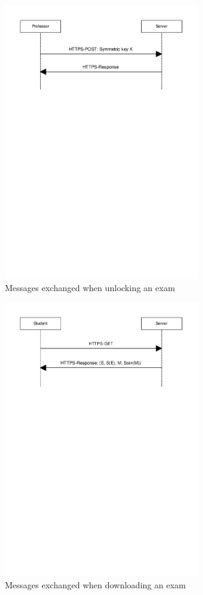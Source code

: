 \documentclass{article}
\begin{document}
\begin{figure}
  \begin{center}
  \includegraphics[width=0.75\textwidth]{images/unlock_exam.pdf}
  \caption{Messages exchanged when unlocking an exam}
  \label{fig:unlock-exam}
  \end{center}
\end{figure}

\begin{figure}
  \begin{center}
  \includegraphics[width=0.75\textwidth]{images/download_exam.pdf}
  \caption{Messages exchanged when downloading an exam}
  \label{fig:download-exam}
  \end{center}
\end{figure}
\end{document}
